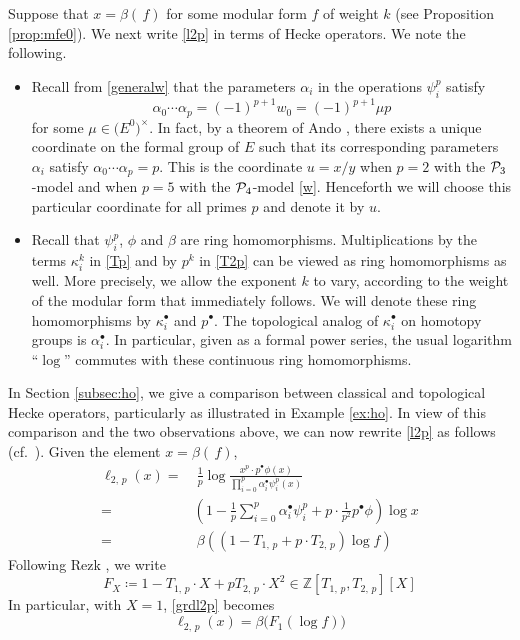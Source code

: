 \documentclass{gtpart}
\theoremstyle{definition}
\theoremstyle{remark}
\newcommand{\mb}[1]{\mathbb{#1}}
\newcommand{\CP}{{\cal P}}
\newcommand{\BZ}{{\mb Z}}
\newcommand{\A}{\alpha}
\newcommand{\B}{\beta}
\newcommand{\K}{\kappa}
\newcommand{\ce}{\coloneqq}
\renewcommand{\=}{\approx}
\renewcommand{\-}{\sim}
\numberwithin{equation}{section}
\begin{document}
Suppose that $x = \B(\,f)$ for some modular form $f$ of weight $k$ (see 
Proposition \ref{prop:mfe0}).  We next write \eqref{l2p} in terms of Hecke 
operators.  We note the following.  
\begin{itemize}
 \item Recall from \eqref{generalw} that the parameters $\A_i$ in the operations 
 $\psi^p_i$ satisfy 
 \[
  \A_0 \cdots \A_p = (-1)^{p+1} w_0 = (-1)^{p+1} \mu p 
 \]
 for some $\mu \in \big( E^0 \big)^{\!\times}$.  In fact, by a theorem of Ando 
 \cite[Theorem 4]{Ando95}, there exists a unique coordinate on the formal group 
 of $E$ such that its corresponding parameters $\A_i$ satisfy 
 $\A_0 \cdots \A_p = p$.  This is the coordinate $u = x/y$ when $p = 2$ with the 
 $\CP_3$-model \cite[Section 3]{h2p2} and when $p = 5$ with the $\CP_4$-model 
 \eqref{w}.  Henceforth we will choose this particular coordinate for all primes 
 $p$ and denote it by $u$.  

 \item Recall that $\psi^p_i$, $\phi$ and $\B$ are ring homomorphisms.  
 Multiplications by the terms $\K_i^k$ in \eqref{Tp} and by $p^k$ in \eqref{T2p} 
 can be viewed as ring homomorphisms as well.  More precisely, we allow the 
 exponent $k$ to vary, according to the weight of the modular form that 
 immediately follows.  We will denote these ring homomorphisms by $\K_i^\bullet$ 
 and $p^\bullet$.  The topological analog of $\K_i^\bullet$ on homotopy groups 
 is $\A_i^\bullet$.  In particular, given as a formal power series, the usual 
 logarithm ``$\log$'' commutes with these continuous ring homomorphisms.  
\end{itemize}
In Section \ref{subsec:ho}, we give a comparison between classical and 
topological Hecke operators, particularly as illustrated in Example \ref{ex:ho}.  
In view of this comparison and the two observations above, we can now rewrite 
\eqref{l2p} as follows (cf.~\cite[1.12]{log}).  Given the element $x = \B(\,f)$, 
\begin{equation}
 \label{grdl2p}
 \begin{split}
  \ell_{2,\,p}(x) = & ~ \frac{1}{p} \log \frac{x^p \cdot p^\bullet 
                      \phi(x)}{\prod_{i=0}^p \A_i^\bullet \psi^p_i(x)} \\
                  = & \left( 1 - \frac{1}{p} \sum_{i = 0}^p \A_i^\bullet 
                      \psi^p_i + p \cdot \frac{1}{p^2} p^\bullet \phi \right) 
                      \log x \\
                  = & ~ \B \left( (1 - T_{1,\,p} + p \cdot T_{2,\,p}) 
                      \log f \right) 
 \end{split}
\end{equation}
Following Rezk \cite[1.12]{log}, we write 
\begin{equation}
 \label{FX}
 F_X \ce 1 - T_{1,\,p} \cdot X + p T_{2,\,p} \cdot X^2 \in 
 \BZ[T_{1,\,p},T_{2,\,p}][X] 
\end{equation}
In particular, with $X = 1$, \eqref{grdl2p} becomes 
\begin{equation}
 \label{F1}
 \ell_{2,\,p}(x) = \B \big( F_1 (\log f) \big) 
\end{equation}
\end{document}
